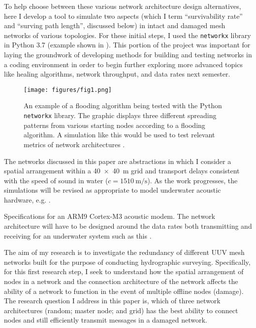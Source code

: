 \documentclass[twocolumn,10pt]{IEEEtran}
\begin{document}
To help choose between these various network architecture design alternatives, here I develop a tool to simulate two aspects (which I term ``survivability rate'' and ``surving path length'', discussed below) in intact and damaged mesh networks of various topologies. For these initial steps, I used the \lstinline{networkx} library \cite{hagberg2008exploring, sphyce2015networkx} in Python 3.7 (example shown in ).  This portion of the project was important for laying the groundwork of developing methods for building and testing networks in a coding environment in order to begin further exploring more advanced topics like healing algorithms, network throughput, and data rates next semester. 
\begin{figure}[h]
\begin{center}
\texttt{[image: figures/fig1.png]}
\end{center}
\caption{An example of a flooding algorithm being tested with the Python \lstinline{networkx} library. The graphic displays three different spreading patterns from various starting nodes according to a flooding algorithm. A simulation like this would be used to test relevant metrics of network architectures \cite{sphyce2015networkx}.}
\label{fig:2}
\end{figure}

The networks discussed in this paper are abstractions in which I consider a spatial arrangement within a \SI{40x40}{\meter} grid and transport delays consistent with the speed of sound in water ($c=\SI{1510}{\meter\per\second}$). As the work progresses, the simulations will be revised as appropriate to model underwater acoustic hardware, e.g. .
\begin{table}[h]
\caption{Specifications for an ARM9 Cortex-M3 acoustic modem. The network architecture will have to be designed around the data rates both transmitting and receiving for an underwater system such as this \cite{arm2013acoustic}.}
\label{tab:1}
\begin{center}

\end{center}
\end{table}

The aim of my research is to investigate the redundancy of different UUV mesh networks built for the purpose of conducting hydrographic surveying. Specifically, for this first research step, I seek to understand how the spatial arrangement of nodes in a network and the connection architecture of the network affects the ability of a network to function in the event of multiple offline nodes (damage). The research question I address in this paper is, which of three network architectures (random; master node; and grid) has the best ability to connect nodes and still efficiently transmit messages in a damaged network.  
\end{document}
